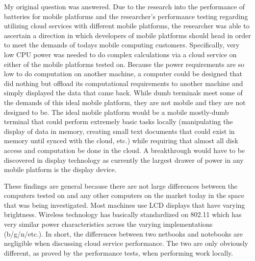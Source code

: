 
My original question was answered.  Due to the research into the performance of
batteries for mobile platforms and the researcher's performance testing
regarding utilizing cloud services with different mobile platforms, the
researcher was able to ascertain a direction in which developers of mobile
platforms should head in order to meet the demands of todays mobile computing
customers.  Specifically, very low CPU power was needed to do complex
calculations via a cloud service on either of the mobile platforms tested on.
Because the power requirements are so low to do computation on another machine,
a computer could be designed that did nothing but offload its computational
requirements to another machine and simply displayed the data that came back.
While dumb terminals meet some of the demands of this ideal mobile platform,
they are not mobile and they are not designed to be.  The ideal mobile platform
would be a mobile mostly-dumb terminal that could perform extremely basic tasks
locally (manipulating the display of data in memory, creating small text
documents that could exist in memory until synced with the cloud, etc.) while
requiring that almost all disk access and computation be done in the cloud.  A
breakthrough would have to be discovered in display technology as currently the
largest drawer of power in any mobile platform is the display device.


These findings are general because there are not large differences between the
computers tested on and any other computers on the market today in the space
that was being investigated.  Most machines use LCD displays that have varying
brightness.  Wireless technology has basically standardized on 802.11 which has
very similar power characteristics across the varying implementations
(b/g/n/etc.).  In short, the differences between two netbooks and notebooks are
negligible when discussing cloud service performance.  The two are only
obviously different, as proved by the performance tests, when performing work
locally.

